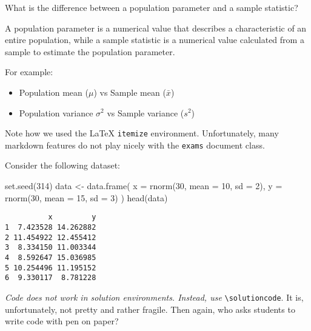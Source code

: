 \documentclass[answers, addpoints]{exam}
\newenvironment{Shaded}{}{}
\newcommand{\AttributeTok}[1]{#1}
\newcommand{\DecValTok}[1]{#1}
\newcommand{\FunctionTok}[1]{#1}
\newcommand{\NormalTok}[1]{#1}
\newcommand{\OtherTok}[1]{#1}
\begin{document}
\begin{questions}
  \question[2]What is the difference between a population parameter and
  a sample statistic?

  \begin{solution}[3cm]
  A population parameter is a numerical value that describes a characteristic of an entire population, while a sample statistic is a numerical value calculated from a sample to estimate the population parameter.

  For example:
  \begin{itemize}
  \item Population mean ($\mu$) vs Sample mean ($\bar{x}$)
  \item Population variance $\sigma^2$ vs Sample variance ($s^2$)
  \end{itemize}

  Note how we used the \LaTeX  { \tt itemize} environment. Unfortunately, many markdown features do not play nicely with the {\tt exams} document class.
  \end{solution}

  \question[5]Consider the following dataset:

\begin{Shaded}
\begin{Highlighting}[]
\FunctionTok{set.seed}\NormalTok{(}\DecValTok{314}\NormalTok{)}
\NormalTok{data }\OtherTok{\textless{}{-}} \FunctionTok{data.frame}\NormalTok{(}
  \AttributeTok{x =} \FunctionTok{rnorm}\NormalTok{(}\DecValTok{30}\NormalTok{, }\AttributeTok{mean =} \DecValTok{10}\NormalTok{, }\AttributeTok{sd =} \DecValTok{2}\NormalTok{),}
  \AttributeTok{y =} \FunctionTok{rnorm}\NormalTok{(}\DecValTok{30}\NormalTok{, }\AttributeTok{mean =} \DecValTok{15}\NormalTok{, }\AttributeTok{sd =} \DecValTok{3}\NormalTok{)}
\NormalTok{)}
\FunctionTok{head}\NormalTok{(data)}
\end{Highlighting}
\end{Shaded}

\begin{verbatim}
          x         y
1  7.423528 14.262882
2 11.454922 12.455412
3  8.334150 11.003344
4  8.592647 15.036985
5 10.254496 11.195152
6  9.330117  8.781228
\end{verbatim}

  \emph{Code does not work in solution environments. Instead, use}
  \texttt{\textbackslash{}solutioncode}. It is, unfortunately, not
  pretty and rather fragile. Then again, who asks students to write code
  with pen on paper? 


\end{questions}
\end{document}
